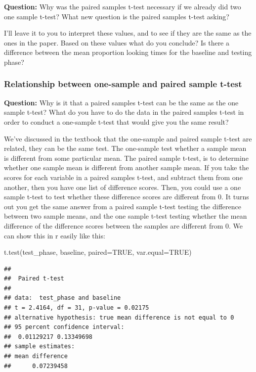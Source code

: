 \documentclass[
]{book}
\newenvironment{Shaded}{\begin{snugshade}}{\end{snugshade}}
\newcommand{\AttributeTok}[1]{\textcolor[rgb]{0.77,0.63,0.00}{#1}}
\newcommand{\ConstantTok}[1]{\textcolor[rgb]{0.00,0.00,0.00}{#1}}
\newcommand{\FunctionTok}[1]{\textcolor[rgb]{0.00,0.00,0.00}{#1}}
\newcommand{\NormalTok}[1]{#1}
\begin{document}
\textbf{Question:} Why was the paired samples t-test necessary if we already did two one sample t-test? What new question is the paired samples t-test asking?

I'll leave it to you to interpret these values, and to see if they are the same as the ones in the paper. Based on these values what do you conclude? Is there a difference between the mean proportion looking times for the baseline and testing phase?

\hypertarget{relationship-between-one-sample-and-paired-sample-t-test}{%
\subsubsection{Relationship between one-sample and paired sample t-test}\label{relationship-between-one-sample-and-paired-sample-t-test}}

\textbf{Question:} Why is it that a paired samples t-test can be the same as the one sample t-test? What do you have to do the data in the paired samples t-test in order to conduct a one-sample t-test that would give you the same result?

We've discussed in the textbook that the one-sample and paired sample t-test are related, they can be the same test. The one-sample test whether a sample mean is different from some particular mean. The paired sample t-test, is to determine whether one sample mean is different from another sample mean. If you take the scores for each variable in a paired samples t-test, and subtract them from one another, then you have one list of difference scores. Then, you could use a one sample t-test to test whether these difference scores are different from 0. It turns out you get the same answer from a paired sample t-test testing the difference between two sample means, and the one sample t-test testing whether the mean difference of the difference scores between the samples are different from 0. We can show this in r easily like this:

\begin{Shaded}
\begin{Highlighting}[]
\FunctionTok{t.test}\NormalTok{(test\_phase, baseline, }\AttributeTok{paired=}\ConstantTok{TRUE}\NormalTok{, }\AttributeTok{var.equal=}\ConstantTok{TRUE}\NormalTok{)}
\end{Highlighting}
\end{Shaded}

\begin{verbatim}
## 
##  Paired t-test
## 
## data:  test_phase and baseline
## t = 2.4164, df = 31, p-value = 0.02175
## alternative hypothesis: true mean difference is not equal to 0
## 95 percent confidence interval:
##  0.01129217 0.13349698
## sample estimates:
## mean difference 
##      0.07239458
\end{verbatim}
\end{document}
